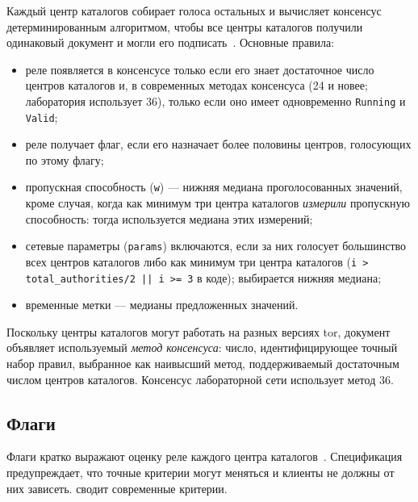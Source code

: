 Каждый центр каталогов собирает голоса остальных и вычисляет консенсус детерминированным алгоритмом, чтобы все центры каталогов получили одинаковый документ и могли его подписать~. Основные правила:
\begin{itemize}
  \item реле появляется в консенсусе только если его знает достаточное число центров каталогов и, в современных методах консенсуса (24 и новее; лаборатория использует 36), только если оно имеет одновременно \texttt{Running} и \texttt{Valid};
  \item реле получает флаг, если его назначает более половины центров, голосующих по этому флагу;
  \item пропускная способность (\texttt{w}) --- нижняя медиана проголосованных значений, кроме случая, когда как минимум три центра каталогов \emph{измерили} пропускную способность: тогда используется медиана этих измерений;
  \item сетевые параметры (\texttt{params}) включаются, если за них голосует большинство всех центров каталогов либо как минимум три центра каталогов (\texttt{i > total\_authorities/2 || i >= 3} в коде); выбирается нижняя медиана;
  \item временные метки --- медианы предложенных значений.
\end{itemize}
Поскольку центры каталогов могут работать на разных версиях tor, документ объявляет используемый \emph{метод консенсуса}: число, идентифицирующее точный набор правил, выбранное как наивысший метод, поддерживаемый достаточным числом центров каталогов. Консенсус лабораторной сети использует метод 36.

\subsection{Флаги}\label{sec:dir-flag}

Флаги кратко выражают оценку реле каждого центра каталогов~. Спецификация предупреждает, что точные критерии могут меняться и клиенты не должны от них зависеть.  сводит современные критерии.

